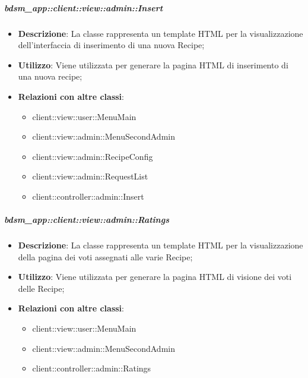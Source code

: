		\subparagraph{bdsm\_app::client::view::admin::Insert} %
		\label{subp:bdsm_app_client_view_admin_insert}
			\begin{itemize}
				\item \textbf{Descrizione}: La classe rappresenta un template HTML per la visualizzazione dell'interfaccia di inserimento di una nuova Recipe;
				\item \textbf{Utilizzo}: Viene utilizzata per generare la pagina HTML di inserimento di una nuova recipe;
				\item \textbf{Relazioni con altre classi}: 		
					\begin{itemize}
						\item client::view::user::MenuMain
						\item client::view::admin::MenuSecondAdmin
						\item client::view::admin::RecipeConfig
						\item client::view::admin::RequestList
						\item client::controller::admin::Insert
					\end{itemize}
			\end{itemize}

		\subparagraph{bdsm\_app::client::view::admin::Ratings} %
		\label{subp:bdsm_app_client_view_admin_ratings}
			\begin{itemize}
				\item \textbf{Descrizione}: La classe rappresenta un template HTML per la visualizzazione della pagina dei voti assegnati alle varie Recipe;
				\item \textbf{Utilizzo}: Viene utilizzata per generare la pagina HTML di visione dei voti delle Recipe;
				\item \textbf{Relazioni con altre classi}: 		
					\begin{itemize}
						\item client::view::user::MenuMain
						\item client::view::admin::MenuSecondAdmin
						\item client::controller::admin::Ratings
					\end{itemize}
			\end{itemize}

